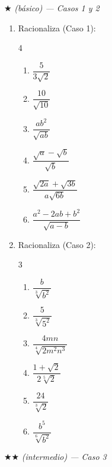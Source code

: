 \documentclass[11pt, letterpaper]{article}
\begin{document}
$\bigstar$ \textit{(básico) — Casos 1 y 2}

\begin{enumerate}[label=\textbf{\arabic*.}, leftmargin=*]
  \item Racionaliza (Caso 1):
  \begin{multicols}{4}
  \begin{enumerate}[label=\alph*)]
    \item $\dfrac{5}{3\sqrt{2}}$
    \item $\dfrac{10}{\sqrt{10}}$
    \item $\dfrac{ab^2}{\sqrt{ab}}$
    \item $\dfrac{\sqrt{a}-\sqrt{b}}{\sqrt{b}}$
    \item $\dfrac{\sqrt{2a}+\sqrt{3b}}{a\sqrt{6b}}$
    \item $\dfrac{a^2-2ab+b^2}{\sqrt{a-b}}$
  \end{enumerate}
  \end{multicols}

  \item Racionaliza (Caso 2):
  \begin{multicols}{3}
  \begin{enumerate}[label=\alph*)]
    \item $\dfrac{b}{\sqrt[3]{b^2}}$
    \item $\dfrac{5}{\sqrt[3]{5^2}}$
    \item $\dfrac{4mn}{\sqrt[4]{2m^2n^3}}$
    \item $\dfrac{1+\sqrt{2}}{2\sqrt[5]{2}}$
    \item $\dfrac{24}{\sqrt[3]{2}}$
    \item $\dfrac{b^5}{\sqrt[6]{b^2}}$
  \end{enumerate}
  \end{multicols}
\end{enumerate}

$\bigstar\bigstar$ \textit{(intermedio) — Caso 3}
\end{document}
